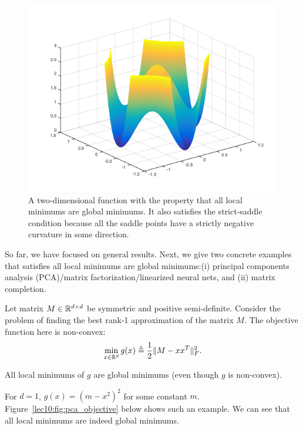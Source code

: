 \begin{figure}[H]
    \centering
    \includegraphics[scale = 0.5]{figures/localmin.png}
    \caption{A two-dimensional function with the property that all local minimums are global minimums. It also satisfies the strict-saddle condition because all the saddle points have a strictly negative curvature in some direction.}
    \label{lec10:fig:strict-saddle}
\end{figure}

So far, we have focused on general results. Next, we give two concrete examples that satisfies all local minimums are global minimums:(i) principal components analysis (PCA)/matrix factorization/linearized neural nets, and (ii) matrix completion.

Let matrix $M \in \mathbb R^{d \times d}$ be symmetric and positive semi-definite. Consider the problem of finding the best rank-1 approximation of the matrix $M$. The objective function here is non-convex:
\begin{equation}
    \min_{x \in \mathbb R^d}g(x) \triangleq \frac{1}{2}\|M - xx^T\|_F^2.
\end{equation}

\begin{theorem}
All local minimums of $g$ are global minimums (even though $g$ is non-convex).
\end{theorem}

\begin{remark}
For $d = 1$, $g(x) = (m - x^2)^2$ for some constant $m$. Figure~\ref{lec10:fig:pca_objective} below shows such an example. We can see that all local minimums are indeed global minimums.
\end{remark}

